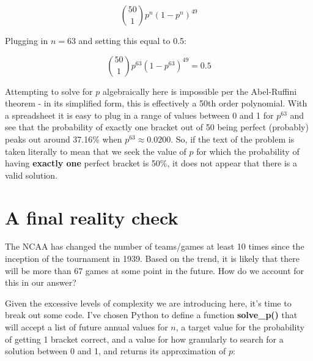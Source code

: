 \documentclass{article}
\begin{document}
\begin{equation}
    {50 \choose 1}p^n(1-p^n)^{49}
\end{equation}

Plugging in $n=63$ and setting this equal to 0.5:

\begin{equation}
    {50 \choose 1}p^{63}(1-p^{63})^{49} = 0.5
\end{equation}

Attempting to solve for $p$ algebraically here is impossible per the Abel-Ruffini theorem - in its simplified form, this is effectively a 50th order polynomial. With a spreadsheet it is easy to plug in a range of values between 0 and 1 for $p^{63}$ and see that the probability of exactly one bracket out of 50 being perfect (probably) peaks out around 37.16\% when $p^{63} \approx 0.0200$. So, if the text of the problem is taken literally to mean that we seek the value of $p$ for which the probability of having \textbf{exactly one} perfect bracket is 50\%, it does not appear that there is a valid solution.

\section{A final reality check}

The NCAA has changed the number of teams/games at least 10 times since the inception of the tournament in 1939. Based on the trend, it is likely that there will be more than 67 games at some point in the future. How do we account for this in our answer?

\vspace{5mm}

Given the excessive levels of complexity we are introducing here, it's time to break out some code. I've chosen Python to define a function \textbf{solve\_p()} that will accept a list of future annual values for $n$, a target value for the probability of getting 1 bracket correct, and a value for how granularly to search for a solution between 0 and 1, and returns its approximation of $p$:
\vspace{5mm}
\end{document}
